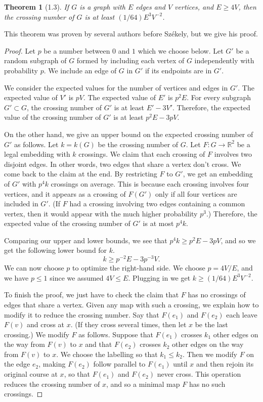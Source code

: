 \documentclass[UTF8,11pt]{ctexart}
\newtheorem*{theorem}{Theorem}
\begin{document}
\begin{theorem}[1.3]
If $G$ is a graph with $E$ edges and $V$ vertices, and $E\geq4V$, then the crossing number of $G$ is at least $(1/64)E^3V^{-2}$.
\end{theorem}
This theorem was proven by several authors before Sz\'ekely, but we give his proof.
\begin{proof}
Let $p$ be a number between $0$ and $1$ which we choose below. Let $G'$ be a random subgraph of $G$ formed by including each vertex of $G$ independently with probability $p$. We include an edge of $G$ in $G'$ if its endpoints are in $G'$.

We consider the expected values for the number of vertices and edges in $G'$. The expected value of $V'$ is $pV$. The expected value of $E'$ is $p^2E$. For every subgraph $G'\subset G$, the crossing number of $G'$ is at least $E'-3V'$. Therefore, the expected value of the crossing number of $G'$ is at least $p^2E-3pV$.

On the other hand, we give an upper bound on the expected crossing number of $G'$ as follows. Let $k=k(G)$ be the crossing number of $G$. Let $F:G\to\mathbb R^2$ be a legal embedding with $k$ crossings. We claim that each crossing of $F$ involves two disjoint edges. In other words, two edges that share a vertex don't cross. We come back to the claim at the end. By restricting $F$ to $G'$, we get an embedding of $G'$ with $p^4k$ crossings on average. This is because each crossing involves four vertices, and it appears as a crossing of $F(G')$ only if all four vertices are included in $G'$. (If $F$ had a crossing involving two edges containing a common vertex, then it would appear with the much higher probability $p^3$.) Therefore, the expected value of the crossing number of $G'$ is at most $p^4k$.

Comparing our upper and lower bounds, we see that $p^4k\geq p^2E-3pV$, and so we get the following lower bound for $k$.
\[
k\geq p^{-2}E-3p^{-3}V.
\]
We can now choose $p$ to optimize the right-hand side. We choose $p=4V/E$, and we have $p\leq1$ since we assumed $4V\leq E$. Plugging in we get $k\geq(1/64)E^3V^{-2}$.

To finish the proof, we just have to check the claim that $F$ has no crossings of edges that share a vertex. Given any map with such a crossing, we explain how to modify it to reduce the crossing number. Say that $F(e_1)$ and $F(e_2)$ each leave $F(v)$ and cross at $x$. (If they cross several times, then let $x$ be the last crossing.) We modify $F$ as follows. Suppose that $F(e_1)$ crosses $k_1$ other edges on the way from $F(v)$ to $x$ and that $F(e_2)$ crosses $k_2$ other edges on the way from $F(v)$ to $x$. We choose the labelling so that $k_1\leq k_2$. Then we modify $F$ on the edge $e_2$, making $F(e_2)$ follow parallel to $F(e_1)$ until $x$ and then rejoin its original course at $x$, so that $F(e_1)$ and $F(e_2)$ never cross. This operation reduces the crossing number of $x$, and so a minimal map $F$ has no such crossings.
\end{proof}
\end{document}
